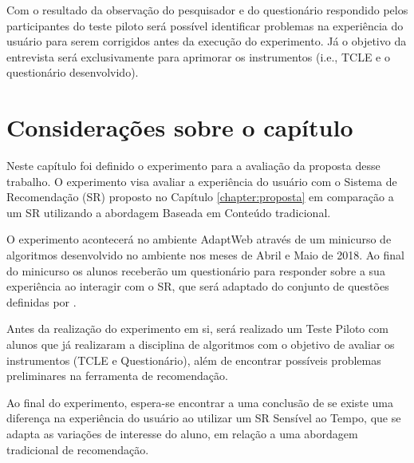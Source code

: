Com o resultado da observação do pesquisador e do questionário respondido pelos participantes do teste piloto será possível
identificar problemas na experiência do usuário para serem corrigidos antes da execução do experimento. Já o objetivo da
entrevista será exclusivamente para aprimorar os instrumentos (i.e., TCLE e o questionário desenvolvido).

\section{Considerações sobre o capítulo}

Neste capítulo foi definido o experimento para a avaliação da proposta desse trabalho. O experimento visa avaliar a experiência
do usuário com o Sistema de Recomendação (SR) proposto no Capítulo \ref{chapter:proposta} em comparação a um SR utilizando
a abordagem Baseada em Conteúdo tradicional.

O experimento acontecerá no ambiente AdaptWeb\textsuperscript{\textregistered} através de um minicurso de algoritmos
desenvolvido no ambiente nos meses de Abril e Maio de 2018. Ao final do minicurso os alunos receberão um questionário
para responder sobre a sua experiência ao interagir com o SR, que será adaptado do conjunto de questões definidas por .

Antes da realização do experimento em si, será realizado um Teste Piloto com alunos que já realizaram a disciplina de algoritmos
com o objetivo de avaliar os instrumentos (TCLE e Questionário), além de encontrar possíveis problemas preliminares na
ferramenta de recomendação.

Ao final do experimento, espera-se encontrar a uma conclusão de se existe uma diferença na experiência do usuário ao
utilizar um SR Sensível ao Tempo, que se adapta as variações de interesse do aluno, em relação a uma abordagem tradicional
de recomendação.
